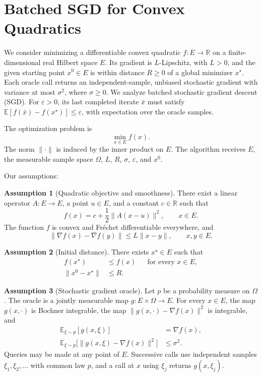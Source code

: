 \documentclass[10pt]{article}
\theoremstyle{definition}
\newtheorem{assumption}{Assumption}
\begin{document}
\section*{Batched SGD for Convex Quadratics}
We consider minimizing a differentiable convex quadratic $f:E\to\mathbb{R}$ on a finite-dimensional real Hilbert space $E$. Its gradient is $L$-Lipschitz, with $L>0$, and the given starting point $x^0\in E$ is within distance $R\geq0$ of a global minimizer $x^\star$. Each oracle call returns an independent-sample, unbiased stochastic gradient with variance at most $\sigma^2$, where $\sigma\geq0$. We analyze batched stochastic gradient descent (SGD). For $\varepsilon>0$, its last completed iterate $\bar{x}$ must satisfy $\mathbb{E}[f(\bar{x})-f(x^\star)]\leq\varepsilon$, with expectation over the oracle samples.

The optimization problem is
\[
\min_{x\in E} f(x).
\]
The norm $\|\cdot\|$ is induced by the inner product on $E$. The algorithm receives $E$, the measurable sample space $\Omega$, $L$, $R$, $\sigma$, $\varepsilon$, and $x^0$.

Our assumptions:
\begin{assumption}[Quadratic objective and smoothness]
There exist a linear operator $A:E\to E$, a point $u\in E$, and a constant $c\in\mathbb{R}$ such that
\[
f(x)=c+\frac{1}{2}\|A(x-u)\|^2,
\qquad x\in E.
\]
The function $f$ is convex and Fr\'echet differentiable everywhere, and
\[
\|\nabla f(x)-\nabla f(y)\|\leq L\|x-y\|,
\qquad x,y\in E.
\]
\end{assumption}

\begin{assumption}[Initial distance]
There exists $x^\star\in E$ such that
\[
\begin{aligned}
f(x^\star)&\leq f(x) &&\text{for every }x\in E,\\
\|x^0-x^\star\|&\leq R.
\end{aligned}
\]
\end{assumption}

\begin{assumption}[Stochastic gradient oracle]
Let $p$ be a probability measure on $\Omega$. The oracle is a jointly measurable map $g:E\times\Omega\to E$. For every $x\in E$, the map $g(x,\cdot)$ is Bochner integrable, the map $\|g(x,\cdot)-\nabla f(x)\|^2$ is integrable, and
\[
\begin{aligned}
\mathbb{E}_{\xi\sim p}[g(x,\xi)]&=\nabla f(x),\\
\mathbb{E}_{\xi\sim p}\bigl[\|g(x,\xi)-\nabla f(x)\|^2\bigr]&\leq\sigma^2.
\end{aligned}
\]
Queries may be made at any point of $E$. Successive calls use independent samples $\xi_1,\xi_2,\ldots$ with common law $p$, and a call at $x$ using $\xi_j$ returns $g(x,\xi_j)$.
\end{assumption}
\end{document}
